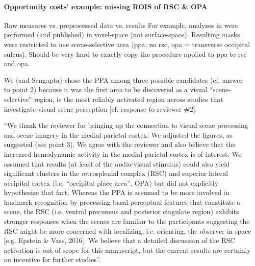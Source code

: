 \paragraph{Opportunity costs' example: missing ROIS of RSC \& OPA}

%
Raw measures vs. preprocessed data vs. results
%
For example, analyzes in \citet{sengupta2016extension} were performed (and
published) in voxel-space (not surface-space).
%
Resulting masks were restricted to one scene-selective area (\ac{ppa}; no
\ac{rsc}, \ac{opa} = transverse occipital sulcus).
%
Should be very hard to exactly copy the procedure applied to \ac{ppa} to
\ac{rsc} and \ac{opa}.


We (and Sengupta) chose the PPA among three possible candidates (cf. answer to
point 2) because it was the first area to be discovered as a visual
``scene-selective'' region, is the most reliably activated region across studies
that investigate visual scene perception [cf. response to reviewer \#2].

``We thank the reviewer for bringing up the connection to visual scene
processing and scene imagery in the medial parietal cortex. We adjusted the
figures, as suggested (see point 3). We agree with the reviewer and also believe
that the increased hemodynamic activity in the medial parietal cortex is of
interest. We assumed that results (at least of the audio-visual stimulus) could
also yield significant clusters in the retrosplenial complex (RSC) and superior
lateral occipital cortex (i.e. “occipital place area”, OPA) but did not
explicitly hypothesize that fact. Whereas the PPA is assumed to be more involved
in landmark recognition by processing basal perceptual features that constitute
a scene, the RSC (i.e. ventral precuneus and posterior cingulate region)
exhibits stronger responses when the scenes are familiar to the participants
suggesting the RSC might be more concerned with localizing, i.e. orienting, the
observer in space [e.g. Epstein \& Vass, 2016]. We believe that a detailed
discussion of the RSC activation is out of scope for this manuscript, but the
current results are certainly an incentive for further studies''.


